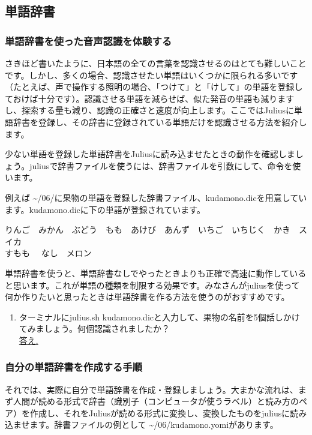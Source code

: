 \subsection{単語辞書}
\subsubsection{単語辞書を使った音声認識を体験する}
さきほど書いたように、日本語の全ての言葉を認識させるのはとても難しいことです。しかし、多くの場合、認識させたい単語はいくつかに限られる多いです（たとえば、声で操作する照明の場合、「つけて」と「けして」の単語を登録しておけば十分です）。認識させる単語を減らせば、似た発音の単語も減りますし、探索する量も減り、認識の正確さと速度が向上します。ここではJuliusに単語辞書を登録し、その辞書に登録されている単語だけを認識させる方法を紹介します。

少ない単語を登録した単語辞書をJuliusに読み込ませたときの動作を確認しましょう。juliusで辞書ファイルを使うには、辞書ファイルを引数にして、命令を使います。\\

例えば \textasciitilde /06/に果物の単語を登録した辞書ファイル、kudamono.dicを用意しています。kudamono.dicに下の単語が登録されています。
\begin{center}
	りんご　みかん　ぶどう　もも　あけび　あんず　いちご　いちじく　かき　スイカ\\すもも　	なし　メロン
\end{center}

単語辞書を使うと、単語辞書なしでやったときよりも正確で高速に動作していると思います。これが単語の種類を制限する効果です。みなさんがjuliusを使って何か作りたいと思ったときは単語辞書を作る方法を使うのがおすすめです。\\

\begin{tcolorbox}[title=\useOmetoi]
\begin{enumerate}
\item ターミナルにjulius.sh kudamono.dicと入力して、果物の名前を5個話しかけてみましょう。何個認識されましたか？\\ \underline{答え.\hspace{0.8\linewidth}}
\end{enumerate}
\end{tcolorbox}

\subsubsection{自分の単語辞書を作成する手順}
それでは、実際に自分で単語辞書を作成・登録しましょう。大まかな流れは、まず人間が読める形式で辞書（識別子（コンピュータが使うラベル）と読み方のペア）を作成し、それをJuliusが読める形式に変換し、変換したものをjuliusに読み込ませます。辞書ファイルの例として \textasciitilde /06/kudamono.yomiがあります。\\

